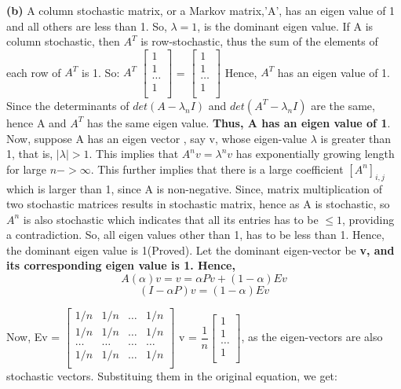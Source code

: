 \documentclass{article}
\renewcommand\part[1]{\vspace{.10in}\textbf{(#1)}}
\begin{document}
   \part{b} A column stochastic matrix, or a Markov matrix,'A', has an eigen value of 1 and all others are less than 1. So, $\lambda = 1$, is the dominant eigen value. If A is column stochastic, then $A^T$ is row-stochastic, thus the sum of the elements of each row of $A^T$ is 1. So: \newline
  $A^T$ $\begin{bmatrix}
	  1 \\
	  1 \\
	  \dots \\
	  1 \\
  \end{bmatrix}$ = $\begin{bmatrix}
	  1 \\
	  1 \\
	  \dots \\
	  1 \\
  \end{bmatrix}$ \newline
  Hence, $A^T$ has an eigen value of 1. Since the determinants of $det(A - \lambda_nI)$ and $det(A^T - \lambda_nI)$ are the same, hence A and $A^T$ has the same eigen value. \textbf {Thus, A has an eigen value of 1}. \newline
  Now, suppose A has an eigen vector , say v, whose eigen-value $\lambda$ is greater than 1, that is, $|\lambda| > 1$. This implies that $A^nv = \lambda^nv$ has exponentially growing length for large $n -> \infty$. This further implies that there is a large coefficient $[A^n]_{i,j}$ which is larger than 1, since A is non-negative. Since, matrix multiplication of two stochastic matrices results in stochastic matrix, hence as A is stochastic, so $A^n$ is also stochastic which indicates that all its entries has to be $\leq 1$, providing a contradiction. So, all eigen values other than 1, has to be less than 1. Hence, the dominant eigen value is 1(Proved). \newline
  Let the dominant eigen-vector be \bf v, and its corresponding eigen value is 1. \newline
  Hence,
  \[ A(\alpha)v = v = \alpha Pv + (1-\alpha)Ev\]
  \[(I - \alpha P)v = (1 - \alpha)Ev\]

  Now, Ev = $\begin{bmatrix}
	  	1/n & 1/n & \dots & 1/n \\
	  	1/n & 1/n & \dots & 1/n \\
		\dots & \dots & \dots & \dots \\
	  	1/n & 1/n & \dots & 1/n \\
  \end{bmatrix}$ v = $\dfrac{1}{n}\begin{bmatrix}
	  			   1 \\
	  			   1 \\
	  			   \dots \\
	  			   1 \\
	  			 \end{bmatrix}$, as the eigen-vectors are also stochastic vectors. Substituing them in the original equation, we get: \newline
\end{document}
